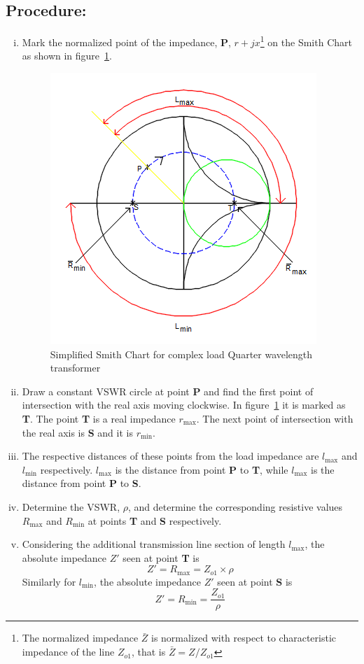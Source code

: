 \subsection*{Procedure:}
\begin{enumerate}[(i)]
\item Mark the normalized point of the impedance, \textbf{P}, $r + jx$\footnote{
The normalized impedance $ \bar{Z}$ is normalized with respect to characteristic impedance of the line $ Z_{o1}$, that is $ \bar{Z} = Z/ Z_{o1}$
} on the Smith Chart as shown in figure~\ref{fig:sinsmith}.
\begin{figure}[h]
\centering
\includegraphics[scale=0.6]{./graphics/sinsmith}
\caption{ Simplified Smith Chart for complex load Quarter wavelength transformer}
\label{fig:sinsmith}
\end{figure}

\item Draw a constant VSWR circle at point \textbf{P} and find the first point of intersection with the real axis moving clockwise. In figure~\ref{fig:sinsmith} it is marked as \textbf{T}. The point \textbf{T} is a real impedance $r_\max$. The next point of intersection with the real axis is \textbf{S} and it is $r_\min$.
\item The respective distances of these points from the load impedance are $ l_\max$ and $ l_\min$ respectively. $ l_\max$ is the distance from point \textbf{P} to \textbf{T}, while $ l_\max$ is the distance from point \textbf{P} to \textbf{S}.
\item Determine the VSWR, $\rho$, and determine the corresponding resistive values $R_\max$ and $R_\min$ at points \textbf{T} and \textbf{S} respectively. 
\item Considering the additional transmission line section of length $ l_\max$, the absolute impedance $ Z'$ seen at point \textbf{T} is
\begin{equation}
Z' = R_\max = Z_{o1}\times\rho
\end{equation}
Similarly for $ l_\min$, the absolute impedance $ Z'$ seen at point \textbf{S} is
\begin{equation}
Z' = R_\min = \frac{Z_{o1}}{\rho}
\end{equation}
\end{enumerate}
